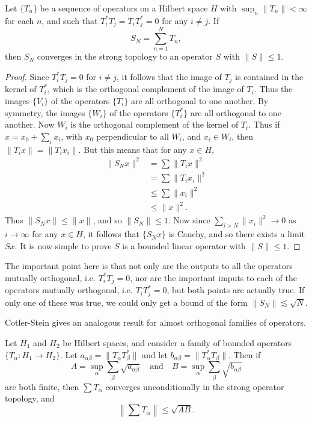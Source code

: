 \begin{lemma}
    Let $\{ T_n \}$ be a sequence of operators on a Hilbert space $H$ with $\sup_n \| T_n \| < \infty$ for each $n$, and such that $T_i^* T_j = T_i T_j^* = 0$ for any $i \neq j$. If
    \[ S_N = \sum_{n = 1}^N T_n, \]
    then $S_N$ converges in the strong topology to an operator $S$ with $\| S \| \leq 1$.
\end{lemma}
\begin{proof}
    Since $T_i^* T_j = 0$ for $i \neq j$, it follows that the image of $T_j$ is contained in the kernel of $T_i^*$, which is the orthogonal complement of the image of $T_i$. Thus the images $\{ V_i \}$ of the operators $\{ T_i \}$ are all orthogonal to one another. By symmetry, the images $\{ W_i \}$ of the operators $\{ T_i^* \}$ are all orthogonal to one another. Now $W_i$ is the orthogonal complement of the kernel of $T_i$. Thus if $x = x_0 + \sum_i x_i$, with $x_0$ perpendicular to all $W_i$, and $x_i \in W_i$, then $\| T_ix \| = \| T_i x_i \|$. But this means that for any $x \in H$,
    \begin{align*}
        \| S_N x \|^2 &= \sum \| T_i x \|^2\\
        &= \sum \| T_i x_i \|^2\\
        &\leq \sum \| x_i \|^2\\
        &\leq \| x \|^2.
    \end{align*}
    Thus $\| S_N x \| \leq \| x \|$, and so $\| S_N \| \leq 1$. Now since $\sum_{i > N} \| x_i \|^2 \to 0$ as $i \to \infty$ for any $x \in H$, it follows that $\{ S_N x \}$ is Cauchy, and so there exists a limit $S x$. It is now simple to prove $S$ is a bounded linear operator with $\| S \| \leq 1$.
\end{proof}

\begin{remark}
    The important point here is that not only are the outputs to all the operators mutually orthogonal, i.e. $T_i^* T_j = 0$, nor are the important imputs to each of the operators mutually orthogonal, i.e. $T_i T_j^* = 0$, but both points are actually true. If only one of these was true, we could only get a bound of the form $\| S_N \| \lesssim \sqrt{N}$.
\end{remark}

Cotler-Stein gives an analogous result for almost orthogonal families of operators.

\begin{theorem}
  Let $H_1$ and $H_2$ be Hilbert spaces, and consider a family of bounded operators $\{ T_\alpha : H_1 \to H_2 \}$. Let $a_{\alpha \beta} = \| T_\alpha T_\beta^* \|$ and let $b_{\alpha \beta} = \| T_\alpha^* T_\beta \|$. Then if
  \[ A = \sup_\alpha \sum_\beta \sqrt{a_{\alpha \beta}} \quad\text{and}\quad B = \sup_\alpha \sum_\beta \sqrt{b_{\alpha \beta}} \]
  are both finite, then $\sum T_\alpha$ converges unconditionally in the strong operator topology, and
  \[ \left\| \sum T_\alpha \right\| \leq \sqrt{AB}. \]
\end{theorem}

